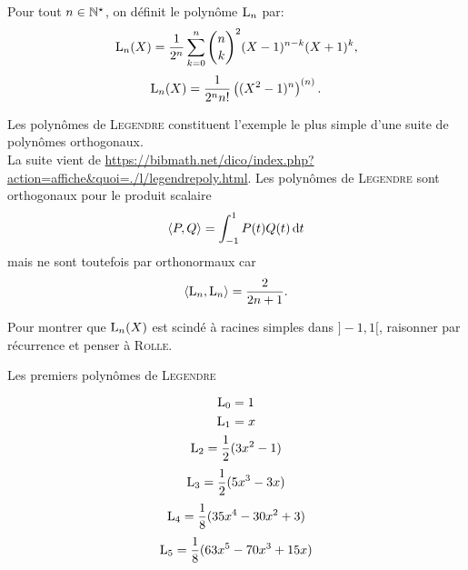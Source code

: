 \begin{defi}
    Pour tout $n \in \mathbb{N}^\star$, on définit le polynôme $\mathrm{L}_n$ par:
    $$\mathrm{L}_n(X) = \frac{1}{2^n} \sum_{k=0}^{n} \binom{n}{k}^2 (X-1)^{n-k}(X+1)^{k},$$
    $$\mathrm{L}_n(X) = \frac{1}{2^n n!} \left( (X^2-1)^n \right)^{(n)}.$$
\end{defi}

Les polynômes de \textsc{Legendre} constituent l'exemple le plus simple d'une suite de polynômes orthogonaux. \\
La suite vient de \url{https://bibmath.net/dico/index.php?action=affiche&quoi=./l/legendrepoly.html}.
Les polynômes de \textsc{Legendre} sont orthogonaux pour le produit scalaire
$$\langle P, Q \rangle = \int_{-1}^1 P(t) Q(t) \, \mathrm{d} t$$
mais ne sont toutefois par orthonormaux car
$$\langle \mathrm{L}_n, \mathrm{L}_n \rangle = \frac{2}{2n+1}.$$

\begin{elem_sol}
    Pour montrer que $\mathrm{L}_n(X)$ est scindé à racines simples dans $]-1, 1[$, raisonner par récurrence et penser à \textsc{Rolle}. 
\end{elem_sol}

\begin{marginfigure}[-11.5cm]
    \centering
	
	\caption*{\centering Les premiers polynômes de \textsc{Legendre}}
	{\small
	\color{blue} $$\mathrm{L}_0 = 1$$ 
	\color{red} $$\mathrm{L}_1 = x$$ 
	\color{green} $$\mathrm{L}_2 = \frac{1}{2}(3x^2-1)$$ 
	\color{purple} $$\mathrm{L}_3 = \frac{1}{2}(5x^3-3x)$$ 
	\color{black} $$\mathrm{L}_4 = \frac{1}{8}(35x^4-30x^2+3)$$ 
	\color{orange} $$\mathrm{L}_5 = \frac{1}{8}(63x^5-70x^3+15x)$$
	}
\end{marginfigure}

